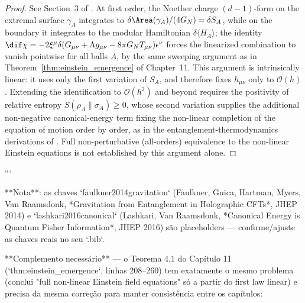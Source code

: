 \begin{proof}
See Section~3 of \cite{silvafilho2026spacetime}. At first order, the Noether charge $(d-1)$-form on the extremal surface $\gamma_A$ integrates to $\delta \Area(\gamma_A)/(4G_N) = \delta S_A$, while on the boundary it integrates to the modular Hamiltonian $\delta\langle H_A\rangle$; the identity $\dif\chi = -2\xi^\mu \delta(G_{\mu\nu} + \Lambda g_{\mu\nu} - 8\pi G_N T_{\mu\nu})\mathbf{\epsilon}^\nu$ forces the linearized combination to vanish pointwise for all balls $A$, by the same sweeping argument as in Theorem~\ref{thm:einstein_emergence} of Chapter~11. This argument is intrinsically linear: it uses only the first variation of $S_A$, and therefore fixes $h_{\mu\nu}$ only to $\mathcal{O}(h)$. Extending the identification to $\mathcal{O}(h^2)$ and beyond requires the positivity of relative entropy $S(\rho_A\|\sigma_A) \ge 0$, whose second variation supplies the additional non-negative canonical-energy term fixing the non-linear completion of the equation of motion order by order, as in the entanglement-thermodynamics derivations of \cite{faulkner2014gravitation, lashkari2016canonical}. Full non-perturbative (all-orders) equivalence to the non-linear Einstein equations is not established by this argument alone.
\end{proof}
```

**Nota**: as chaves `faulkner2014gravitation` (Faulkner, Guica, Hartman, Myers, Van Raamsdonk, *Gravitation from Entanglement in Holographic CFTs*, JHEP 2014) e `lashkari2016canonical` (Lashkari, Van Raamsdonk, *Canonical Energy is Quantum Fisher Information*, JHEP 2016) são placeholders — confirme/ajuste as chaves reais no seu `.bib`.

**Complemento necessário** — o Teorema 4.1 do Capítulo 11 (`thm:einstein_emergence`, linhas 208–260) tem exatamente o mesmo problema (conclui "full non-linear Einstein field equations" só a partir do first law linear) e precisa da mesma correção para manter consistência entre os capítulos:

